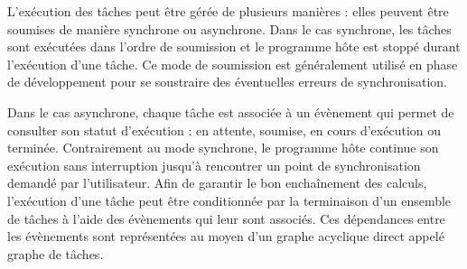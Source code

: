 L’exécution des tâches peut être gérée de plusieurs manières :
elles peuvent être soumises de manière synchrone ou asynchrone.
Dans le cas synchrone, les tâches sont exécutées dans l’ordre de soumission et
le programme hôte est stoppé durant l’exécution d'une tâche.
Ce mode de soumission est généralement utilisé en phase de développement
pour se soustraire des éventuelles erreurs de synchronisation.

Dans le cas asynchrone, chaque tâche est associée à un évènement qui permet
de consulter son statut d’exécution : en attente, soumise, en cours d’exécution
ou terminée. Contrairement au mode synchrone, le programme hôte continue son
exécution sans interruption jusqu'à rencontrer un point de synchronisation demandé
par l'utilisateur. Afin de garantir le bon enchaînement des calculs,
l’exécution d’une tâche peut être conditionnée par la terminaison d’un ensemble
de tâches à l’aide des évènements qui leur sont associés. Ces dépendances entre
les évènements sont représentées au moyen d’un graphe acyclique direct appelé
graphe de tâches.
\\

